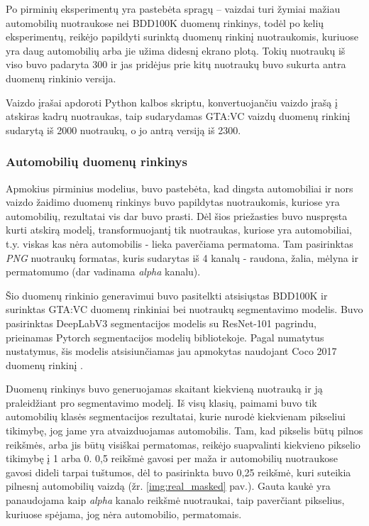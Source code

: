 \documentclass{VUMIFPSbakalaurinis}
\begin{document}
            Po pirminių eksperimentų yra pastebėta spragų – vaizdai turi žymiai mažiau automobilių nuotraukose nei BDD100K duomenų rinkinys, todėl po kelių eksperimentų, reikėjo papildyti surinktą duomenų rinkinį nuotraukomis, kuriuose yra daug automobilių arba jie užima didesnį ekrano plotą. Tokių nuotraukų iš viso buvo padaryta 300 ir jas pridėjus prie kitų nuotraukų buvo sukurta antra duomenų rinkinio versija.

            Vaizdo įrašai apdoroti Python kalbos skriptu, konvertuojančiu vaizdo įrašą į atskiras kadrų nuotraukas, taip sudarydamas GTA:VC vaizdų duomenų rinkinį sudarytą iš 2000 nuotraukų, o jo antrą versiją iš 2300.
        
        \subsubsection{Automobilių duomenų rinkinys}
            Apmokius pirminius modelius, buvo pastebėta, kad dingsta automobiliai ir nors vaizdo žaidimo duomenų rinkinys buvo papildytas nuotraukomis, kuriose yra automobilių, rezultatai vis dar buvo prasti. Dėl šios priežasties buvo nuspręsta kurti atskirą modelį, transformuojantį tik nuotraukas, kuriose yra automobiliai, t.y. viskas kas nėra automobilis - lieka paverčiama permatoma. Tam pasirinktas \emph{PNG} nuotraukų formatas, kuris sudarytas iš 4 kanalų - raudona, žalia, mėlyna ir permatomumo (dar vadinama \emph{alpha} kanalu).

            Šio duomenų rinkinio generavimui buvo pasitelkti atsisiųstas BDD100K ir surinktas GTA:VC duomenų rinkiniai bei nuotraukų segmentavimo modelis. Buvo pasirinktas DeepLabV3 segmentacijos modelis su ResNet-101 pagrindu, prieinamas Pytorch segmentacijos modelių bibliotekoje. Pagal numatytus nustatymus, šis modelis atsisiunčiamas jau apmokytas naudojant Coco 2017 duomenų rinkinį \cite{CocoDataset}.

            Duomenų rinkinys buvo generuojamas skaitant kiekvieną nuotrauką ir ją praleidžiant pro segmentavimo modelį. Iš visų klasių, paimami buvo tik automobilių klasės segmentacijos rezultatai, kurie nurodė kiekvienam pikseliui tikimybę, jog jame yra atvaizduojamas automobilis. Tam, kad pikselis būtų pilnos reikšmės, arba jis būtų visiškai permatomas, reikėjo suapvalinti kiekvieno pikselio tikimybę į 1 arba 0. 0,5 reikšmė gavosi per maža ir automobilių nuotraukose gavosi dideli tarpai tuštumos, dėl to pasirinkta buvo 0,25 reikšmė, kuri suteikia pilnesnį automobilių vaizdą (žr. \ref{img:real_masked} pav.). Gauta kaukė yra panaudojama kaip \emph{alpha} kanalo reikšmė nuotraukai, taip paverčiant pikselius, kuriuose spėjama, jog nėra automobilio, permatomais.
\end{document}
